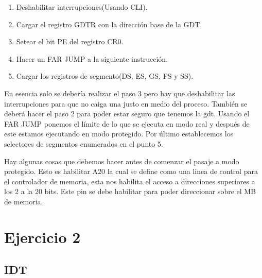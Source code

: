 \documentclass[a4paper]{article}
\begin{document}
\begin{enumerate}
\item Deshabilitar interrupciones(Usando CLI).
\item Cargar el registro GDTR con la dirección base de la GDT.
\item Setear el bit PE del registro CR0.
\item Hacer un FAR JUMP a la siguiente instrucción.
\item Cargar los registros de segmento(DS, ES, GS, FS y SS).
\end{enumerate}

En esencia solo se debería realizar el paso 3 pero hay que deshabilitar las interrupciones para que no caiga una justo en medio del proceso. También se deberá hacer el paso 2 para poder estar seguro que tenemos la gdt. Usando el FAR JUMP ponemos el límite de lo que se ejecuta en modo real y después de este estamos ejecutando en modo protegido. Por último establecemos los selectores de segmentos enumerados en el punto 5. 

Hay algunas cosas que debemos hacer antes de comenzar el pasaje a modo protegido. Esto es habilitar A20 la cual se define como una linea de control para el controlador de memoria, esta nos habilita el acceso a direcciones superiores a los 2 a la 20 bits. Este pin se debe habilitar para poder direccionar sobre el MB de memoria.

\section{Ejercicio 2}

\subsection{IDT}
\end{document}
